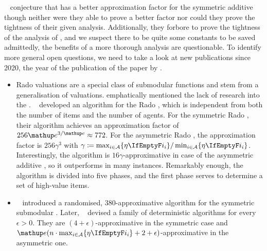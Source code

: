 ~\cite{APNSWuSVþUM} conjecture that \SMatch{} has a better approximation factor for the symmetric additive \NSW{} though neither were they able to prove a better factor nor could they prove the tightness of their given analysis.
Additionally, they forbore to prove the tightness of the analysis of \RepReMatch{}, and we suspect there to be quite some constants to be saved \Dash admittedly, the benefits of a more thorough analysis are questionable.
To identify more general open questions, we need to take a look at new publications since 2020, the year of the publication of the paper by \citeauthor{APNSWuSVþUM}.
\begin{itemize}
	\item
	Rado valuations are a special class of submodular functions and stem from a generalisation of \OXS{} valuations.
	 emphatically mentioned the lack of research into the \OXS{} \NSW.
	~\cite{approximating_nsw_under_rado_valuations} developed an algorithm for the Rado \NSW, which is independent from both the number of items and the number of agents.
	For the symmetric Rado \NSW, their algorithm achieves an approximation factor of \(256 \euler^{3/\euler} \approx 772\).
	For the asymmetric Rado \NSW, the approximation factor is \(256 \gamma^3\) with \(\gamma \coloneq \max_{i \in \agents} \braces{\weight} / \min_{i \in \agents} \braces{\weight}\).
	Interestingly, the algorithm is \(16 \gamma\)-approximative in case of the asymmetric additive \NSW, so it outperforms \SMatch{} in many instances.
	Remarkably enough, the algorithm is divided into five phases, and the first phase serves to determine a set of high-value items.

	\item
	\citeauthor{a_constfactor_approx_algo_for_nsw_with_submod_valuations}~\cite{a_constfactor_approx_algo_for_nsw_with_submod_valuations} introduced a randomised, \(380\)-approximative algorithm for the symmetric submodular \NSW.
	Later, \citeauthor{approx_nsw_by_matching_and_local_search}~\cite{approx_nsw_by_matching_and_local_search} devised a family of deterministic algorithms for every \(\epsilon > 0\).
	They are \((4+\epsilon)\)-approximative in the symmetric case and \(\euler(n \cdot \max_{i \in \agents} \braces{\weight} + 2 + \epsilon)\)-approximative in the asymmetric one.


\end{itemize}
